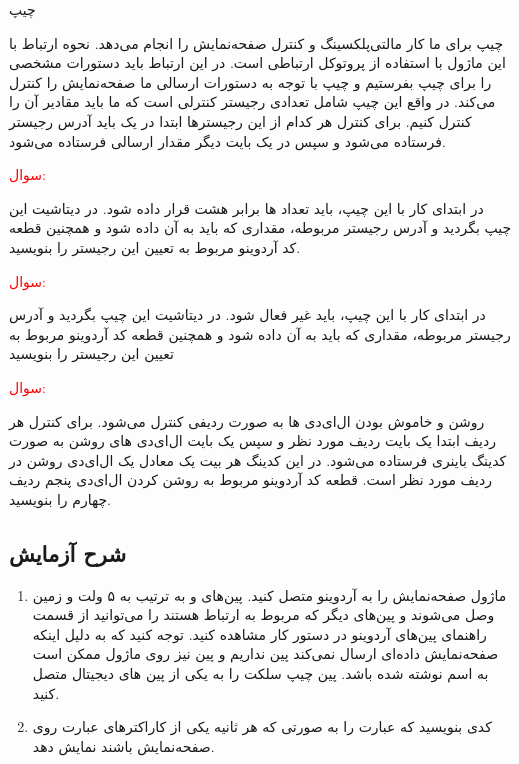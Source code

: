 \newline
\begin{nas}چیپ \end{nas}
\newline

چیپ 
برای ما کار مالتی‌پلکسینگ و کنترل صفحه‌نمایش را انجام می‌دهد. نحوه ارتباط با این ماژول با استفاده از پروتوکل ارتباطی  است. در این ارتباط باید دستورات مشخصی را برای چیپ بفرستیم و چیپ با توجه به دستورات ارسالی ما صفحه‌نمایش را کنترل می‌کند. در واقع این چیپ شامل تعدادی رجیستر کنترلی است که ما باید مقادیر آن را کنترل کنیم. برای کنترل هر کدام از این رجیسترها ابتدا در یک باید آدرس رجیستر فرستاده می‌شود و سپس در یک بایت دیگر مقدار ارسالی فرستاده می‌شود.

\newline
\textcolor{red}{\begin{nas}سوال: \end{nas}}
در ابتدای کار با این چیپ، باید تعداد  ها برابر هشت قرار داده شود. در دیتاشیت این چیپ بگردید و آدرس رجیستر مربوطه، مقداری که باید به آن داده شود و همچنین قطعه کد آردوینو مربوط به تعیین این رجیستر را بنویسید.

\newline
\textcolor{red}{\begin{nas}سوال: \end{nas}}
در ابتدای کار با این چیپ، باید  
غیر فعال شود. در دیتاشیت این چیپ بگردید و آدرس رجیستر مربوطه، مقداری که باید به آن داده شود و همچنین قطعه کد آردوینو مربوط به تعیین این رجیستر را بنویسید

\newline
\textcolor{red}{\begin{nas}سوال: \end{nas}}
روشن و خاموش بودن ال‌ای‌دی ها به صورت ردیفی کنترل می‌شود. برای کنترل هر ردیف ابتدا یک بایت ردیف مورد نظر و سپس یک بایت ال‌ای‌دی های روشن به صورت کدینگ باینری فرستاده می‌شود. در این کدینگ هر بیت یک معادل یک ال‌ای‌دی روشن در ردیف مورد نظر است. قطعه کد آردوینو مربوط به روشن کردن ال‌ای‌دی پنجم ردیف چهارم را بنویسید.

\subsection{شرح آزمایش}

\begin{enumerate}
    \item ماژول صفحه‌نمایش را به آردوینو متصل کنید. پین‌های  و  به ترتیب به ۵ ولت و زمین وصل می‌شوند و پین‌های دیگر که مربوط به ارتباط  هستند را می‌توانید از قسمت راهنمای پین‌های آردوینو در دستور کار مشاهده کنید. توجه کنید که به دلیل اینکه صفحه‌نمایش داده‌ای ارسال نمی‌کند پین  نداریم و پین  نیز روی ماژول ممکن است به اسم  نوشته شده باشد. پین چیپ سلکت را به یکی از پین های دیجیتال متصل کنید.
    \item کدی بنویسید که عبارت  را به صورتی که هر ثانیه یکی از کاراکترهای عبارت روی صفحه‌نمایش باشند نمایش دهد.
\end{enumerate}